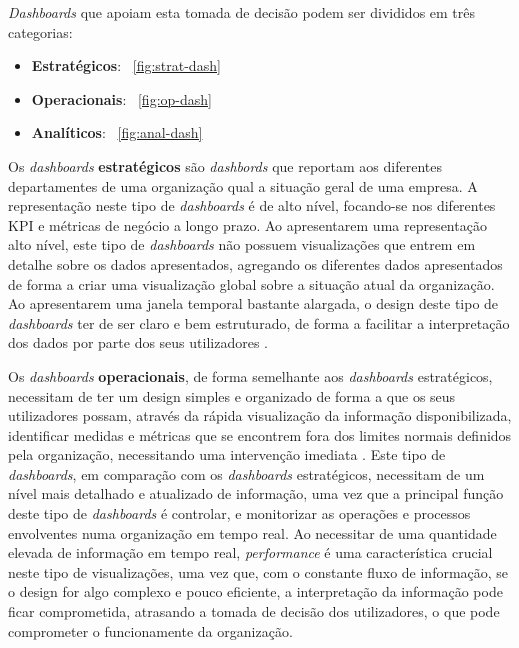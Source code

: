 \textit{Dashboards} que apoiam esta tomada de decisão podem ser divididos em três categorias:

\begin{itemize}
  \item \textbf{Estratégicos}: ~\ref{fig:strat-dash}
  \item \textbf{Operacionais}: ~\ref{fig:op-dash}
  \item \textbf{Analíticos}: ~\ref{fig:anal-dash}
\end{itemize}

Os \textit{dashboards} \textbf{estratégicos} são \textit{dashbords} que reportam aos diferentes departamentes de uma organização qual a situação geral de uma empresa. A representação neste tipo de \textit{dashboards} é de alto nível, focando-se nos diferentes \gls{KPI} e métricas de negócio a longo prazo. Ao apresentarem uma representação alto nível, este tipo de \textit{dashboards} não possuem visualizações que entrem em detalhe sobre os dados apresentados, agregando os diferentes dados apresentados de forma a criar uma visualização global sobre a situação atual da organização. Ao apresentarem uma janela temporal bastante alargada, o design deste tipo de \textit{dashboards} ter de ser claro e bem estruturado, de forma a facilitar a interpretação dos dados por parte dos seus utilizadores \cite{pappas2011riding}. 

Os \textit{dashboards} \textbf{operacionais}, de forma semelhante aos \textit{dashboards} estratégicos, necessitam de ter um design simples e organizado de forma a que os seus utilizadores possam, através da rápida visualização da informação disponibilizada, identificar medidas e métricas que se encontrem fora dos limites normais definidos pela organização, necessitando uma intervenção imediata \cite{pappas2011riding}. Este tipo de \textit{dashboards}, em comparação com os \textit{dashboards} estratégicos, necessitam de um nível mais detalhado e atualizado de informação, uma vez que a principal função deste tipo de \textit{dashboards} é controlar, e monitorizar as operações e processos envolventes numa organização em tempo real. Ao necessitar de uma quantidade elevada de informação em tempo real, \textit{performance} é uma característica crucial neste tipo de visualizações, uma vez que, com o constante fluxo de informação, se o design for algo complexo e pouco eficiente, a interpretação da informação pode ficar comprometida, atrasando a tomada de decisão dos utilizadores, o que pode comprometer o funcionamente da organização.

